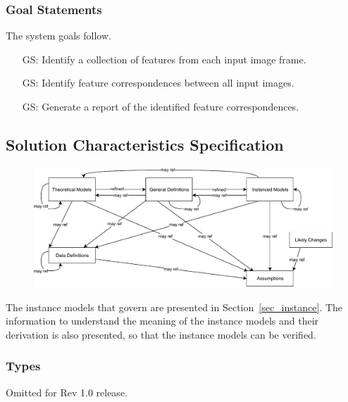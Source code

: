 \documentclass[12pt]{article}
\newcounter{goalnum} %
\begin{document}
\newpage
\subsubsection{Goal Statements}
\noindent The system goals follow.

\begin{itemize}
  \item[GS\refstepcounter{goalnum}\thegoalnum \label{identify_features}:]
    Identify a collection of features from each input image frame. 
  \item[GS\refstepcounter{goalnum}\thegoalnum \label{identify_matches}:] 
    Identify feature correspondences between all input images.
  \item[GS\refstepcounter{goalnum}\thegoalnum \label{report_matches}:]
    Generate a report of the identified feature correspondences.
    
\end{itemize}

\subsection{Solution Characteristics Specification}
\begin{figure}[H]
  \includegraphics[scale=0.85]{RelationsBetweenTM_GD_IM_DD_A.pdf}
\end{figure}

The instance models that govern \progname{} are presented in
Section~\ref{sec_instance}.  The information to understand the meaning of the
instance models and their derivation is also presented, so that the instance
models can be verified.

\subsubsection{Types}
Omitted for Rev 1.0 release.
\end{document}
